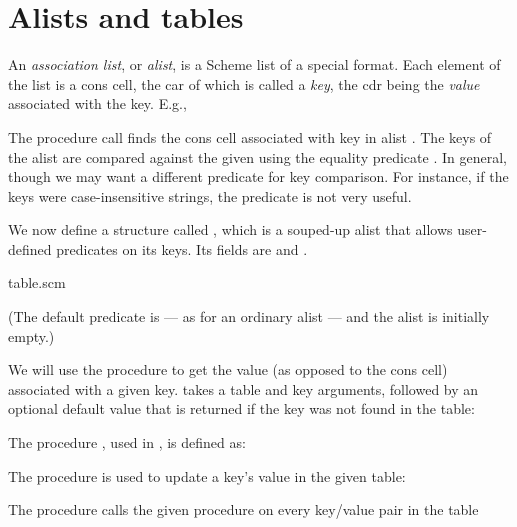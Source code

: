 \chapter{Alists and tables}

An {\em association list}, or {\em alist}, is a Scheme
list of a special format.  Each element of the list is
a cons cell, the car of which is called a {\em key},
the cdr being the {\em value} associated with the key.
E.g.,



The procedure call  finds the cons cell
associated with key  in alist .  The keys of
the alist are compared against the given  using
the equality predicate .  In general, though we
may want a different predicate for key comparison.  For
instance, if the keys were case-insensitive strings,
the predicate  is not very useful.


We now define a structure called , which is a
souped-up alist that allows user-defined predicates on
its keys.  Its fields are  and .

\scmfilename table.scm



\n (The default predicate is  — as for an
ordinary alist — and the alist is initially empty.)

We will use the procedure  to get the
value (as opposed to the cons cell) associated with a
given key.   takes a table and key
arguments, followed by an optional default value that
is returned if the key was not found in the table:


The procedure , used in , is
defined as:


The procedure  is used to update a key’s
value in the given table:


The procedure  calls the given
procedure on every key/value pair in the table





